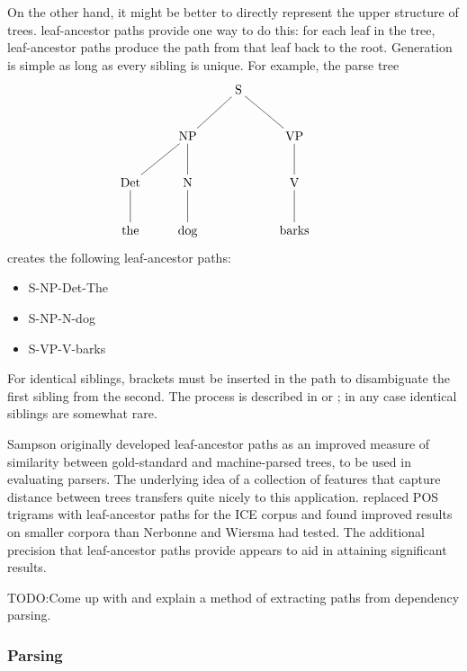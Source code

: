 \documentclass[11pt]{article}
\begin{document}
On the other hand, it might be better to directly represent the upper
structure of trees.  leaf-ancestor paths provide
one way to do this: for each leaf in the
tree, leaf-ancestor paths produce the path from that leaf back to the
root. Generation is
simple as long as every sibling is unique. For example, the parse tree
\[\xymatrix{
  &&\textrm{S} \ar@{-}[dl] \ar@{-}[dr] &&\\
  &\textrm{NP} \ar@{-}[d] \ar@{-}[dl] &&\textrm{VP} \ar@{-}[d]\\
  \textrm{Det} \ar@{-}[d] & \textrm{N} \ar@{-}[d] && \textrm{V} \ar@{-}[d] \\
\textrm{the}& \textrm{dog} && \textrm{barks}\\}
\]
creates the following leaf-ancestor paths:

\begin{itemize}
\item S-NP-Det-The
\item S-NP-N-dog
\item S-VP-V-barks
\end{itemize}

For identical siblings, brackets must be inserted in the path to
disambiguate the first sibling from the second. The process is
described in  or ;
in any case identical siblings are somewhat rare.

Sampson originally developed leaf-ancestor paths as an improved
measure of similarity between gold-standard and machine-parsed trees,
to be used in evaluating parsers. The underlying idea of a collection of
features that capture distance between trees transfers quite nicely to
this application.  replaced POS trigrams with
leaf-ancestor paths for the ICE corpus and found improved results on
smaller corpora than Nerbonne and Wiersma had tested. The additional
precision that leaf-ancestor paths provide appears to aid in attaining
significant results.


TODO:Come up with and explain a method of extracting paths from
dependency parsing.

\subsubsection{Parsing}
\end{document}
